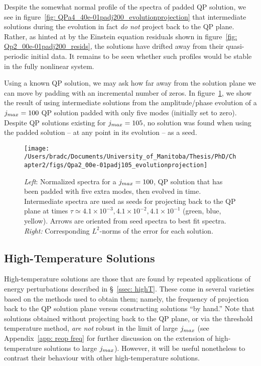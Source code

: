 \documentclass[../PhD.tex]{subfiles}
\begin{document}
Despite the somewhat normal profile of the spectra of padded QP solution, we see in figure~\ref{fig: QPa4_40e-01padj200_evolutionprojection} that intermediate solutions during the evolution in fact \emph{do not} project back to the QP plane. Rather, as hinted at by the Einstein equation residuals shown in figure~\ref{fig: Qp2_00e-01padj200_resids}, the solutions have drifted away from their quasi-periodic initial data. It remains to be seen whether such profiles would be stable in the fully nonlinear system.

Using a known QP solution, we may ask how far away from the solution plane we can move by padding with an incremental number of zeros. In figure~\ref{fig: Qpa2_00e-01padj105_evolutionprojection}, we show the result of using intermediate solutions from the amplitude/phase evolution of a $j_{max} = 100$ QP solution padded with only five modes (initially set to zero). Despite QP solutions existing for $j_{max} = 105$, no solution was found when using the padded solution -- at any point in its evolution -- as a seed.

\begin{figure}[ht]
	\centering
	\texttt{[image: /Users/bradc/Documents/University\_of\_Manitoba/Thesis/PhD/Chapter2/figs/Qpa2\_00e-01padj105\_evolutionprojection]}
	\caption[Spectra during evolution of a padded QP solution are used as seeds to project back to the QP plane]{{\it Left}: Normalized spectra for a $j_{max} = 100$, QP solution that has been padded with five extra modes, then evolved in time. Intermediate spectra are used as seeds for projecting back to the QP plane at times $\tau \simeq 4.1 \times 10^{-3}, 4.1 \times 10^{-2}, 4.1 \times 10^{-1}$ (green, blue, yellow). Arrows are oriented from seed spectra to best fit spectra. {\it Right:} Corresponding $L^2$-norms of the error for each solution.}
	\label{fig: Qpa2_00e-01padj105_evolutionprojection}
\end{figure}


\subsection{High-Temperature Solutions}

High-temperature solutions are those that are found by repeated applications of energy perturbations described in \S\!~\ref{ssec: highT}. These come in several varieties based on the methods used to obtain them; namely, the frequency of projection back to the QP solution plane versus constructing solutions ``by hand.'' Note that solutions obtained without projecting back to the QP plane, or via the threshold temperature method, \emph{are not} robust in the limit of large $j_{max}$ (see Appendix~\ref{app: reop freq} for further discussion on the extension of high-temperature solutions to large $j_{max}$). However, it will be useful nonetheless to contrast their behaviour with other high-temperature solutions.
\end{document}
